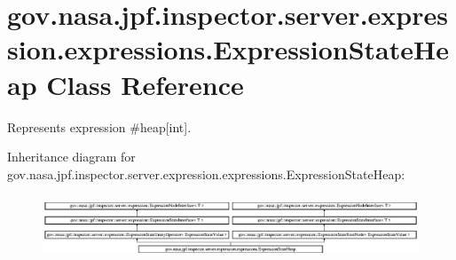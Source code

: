 \hypertarget{classgov_1_1nasa_1_1jpf_1_1inspector_1_1server_1_1expression_1_1expressions_1_1_expression_state_heap}{}\section{gov.\+nasa.\+jpf.\+inspector.\+server.\+expression.\+expressions.\+Expression\+State\+Heap Class Reference}
\label{classgov_1_1nasa_1_1jpf_1_1inspector_1_1server_1_1expression_1_1expressions_1_1_expression_state_heap}


Represents expression \#heap\mbox{[}int\mbox{]}.  


Inheritance diagram for gov.\+nasa.\+jpf.\+inspector.\+server.\+expression.\+expressions.\+Expression\+State\+Heap\+:\begin{figure}[H]
\begin{center}
\leavevmode
\includegraphics[height=1.898305cm]{classgov_1_1nasa_1_1jpf_1_1inspector_1_1server_1_1expression_1_1expressions_1_1_expression_state_heap}
\end{center}
\end{figure}
